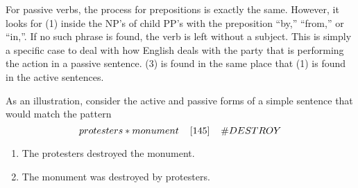 \documentclass[11pt]{article}
\begin{document}
For passive verbs, the process for prepositions is exactly the same. However, it 
looks for (1) inside the NP's of child PP's with the preposition ``by,'' ``from,'' or 
``in,''. If no such phrase is found, the verb is left without a subject. This is simply a specific case to deal with how English deals with the 
party that is performing the action in a passive sentence. (3) is found in the 
same place that (1) is found in the active sentences. 

As an illustration, consider the active and passive forms of a simple sentence that would match the pattern
$$ protesters * monument \hspace{4mm} [145]\hspace{4mm} \# DESTROY  $$
 \begin{enumerate} \item The protesters destroyed the 
monument.
\vspace{10mm}

                    
                    
   \vspace{10mm}                 
           
\item The monument was destroyed by protesters. 

                   
           \vspace{10mm}         

\end{enumerate}
\end{document}
